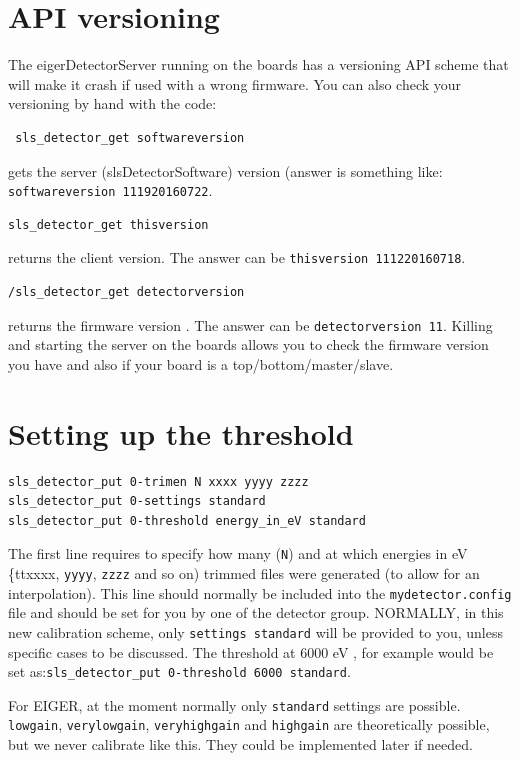 \documentclass{article}
\newcommand{\E}{EIGER\xspace}
\begin{document}
\section{API versioning} \label{api}
The eigerDetectorServer running on the boards has a versioning API scheme that will make it crash if used with a wrong firmware.
You can also check your versioning by hand with the code:
\begin{verbatim}
 sls_detector_get softwareversion
\end{verbatim}
gets the server (slsDetectorSoftware) version (answer is something like: {\tt{softwareversion 111920160722}}.
 \begin{verbatim}
sls_detector_get thisversion 
\end{verbatim}
returns the client version. The answer can be {\tt{thisversion 111220160718}}.
\begin{verbatim}
/sls_detector_get detectorversion
\end{verbatim}
returns the firmware version . The answer can be {\tt{detectorversion 11}}.
Killing and starting the server on the boards allows you to check the firmware version you have and also if your board is a top/bottom/master/slave.

\section{Setting up the threshold}
\begin{verbatim}
sls_detector_put 0-trimen N xxxx yyyy zzzz
sls_detector_put 0-settings standard 
sls_detector_put 0-threshold energy_in_eV standard
\end{verbatim}
The first line requires to specify how many ({\tt{N}}) and at which energies in eV {\{tt{xxxx}}, {\tt{yyyy}}, {\tt{zzzz}} and so on) trimmed files were generated (to allow for an interpolation). This line should normally be included into the {\tt{mydetector.config}} file and should be set for you by one of the detector group.
NORMALLY, in this new calibration scheme, only {\tt{settings standard}} will be provided to you, unless specific cases to be discussed.
The threshold at 6000 eV , for example would be set as:{\tt{sls\_detector\_put 0-threshold 6000 standard}}.

For \E, at the moment normally only {\tt{standard}} settings are possible.
 {\tt{lowgain}}, {\tt{verylowgain}}, {\tt{veryhighgain}} and {\tt{highgain}} are theoretically possible, but we never calibrate like this. They could be implemented later if needed. 
\end{document}
